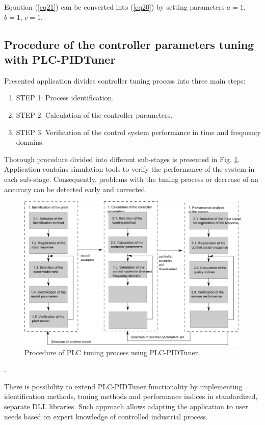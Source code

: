 \documentclass{amcs}
\begin{document}
Equation (\ref{eq21}) can be converted into (\ref{eq20}) by setting parameters $a=1$, $b=1$, $c=1$. 
%
\subsection{Procedure of the controller parameters tuning with PLC-PIDTuner}
Presented application  divides controller tuning process into three main steps:

\begin{enumerate}
	\item STEP 1: Process identification.
	\item STEP 2: Calculation of the controller parameters.
	\item STEP 3: Verification of the control system performance in time and frequency domains.
\end{enumerate}

Thorough procedure divided into different sub-stages is presented in Fig. \ref{fig1}. Application contains simulation tools to verify the performance of the system in each sub-stage. Consequently, problems with the tuning process or decrease of an accuracy can be detected early and corrected. 

\begin{figure}[!t]
	\centering
	\includegraphics[width=1\textwidth]
	{Figure1}
	\caption{Procedure of PLC tuning process using PLC-PIDTuner.}
	\label{fig1}
\end{figure}.

There is possibility to extend PLC-PIDTuner functionality by implementing identification methods, tuning methods and performance indices in standardized, separate DLL libraries. Such approach allows adapting the application to user needs based on expert knowledge of controlled industrial process. 
\end{document}
